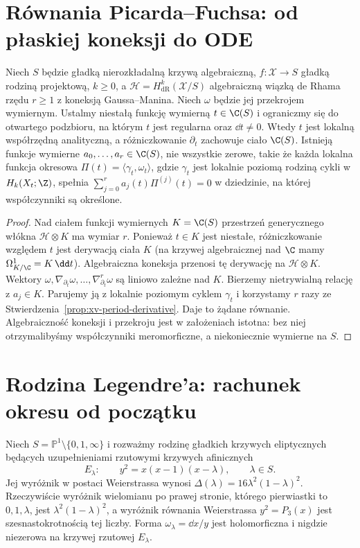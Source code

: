 \section{Równania Picarda--Fuchsa: od płaskiej koneksji do ODE}
\begin{stwierdzenie}
\label{prop:xv-pf-general}
Niech $S$ będzie gładką nierozkładalną krzywą algebraiczną,
$f:\mathcal X\to S$ gładką rodziną projektową,
$k\ge0$, a
$\mathcal H=H^k_{\mathrm{dR}}(\mathcal X/S)$
algebraiczną wiązką de Rhama rzędu $r\ge1$
z koneksją Gaussa--Manina.
Niech $\omega$ będzie jej przekrojem wymiernym. Ustalmy niestałą funkcję wymierną $t\in\C(S)$
i ograniczmy się do otwartego podzbioru, na którym $t$
jest regularna oraz $\dd t\neq0$. Wtedy $t$ jest
lokalną współrzędną analityczną, a różniczkowanie
$\partial_t$ zachowuje ciało $\C(S)$. Istnieją
funkcje wymierne $a_0,\dots,a_r\in\C(S)$, nie wszystkie zerowe,
takie że każda lokalna funkcja okresowa
$\Pi(t)=\langle\gamma_t,\omega_t\rangle$,
gdzie $\gamma_t$ jest lokalnie poziomą rodziną
cykli w $H_k(X_t;\Z)$, spełnia
$\sum_{j=0}^ra_j(t)\Pi^{(j)}(t)=0$
w dziedzinie, na której współczynniki są określone.
\end{stwierdzenie}
\begin{proof}
Nad ciałem funkcji wymiernych $K=\C(S)$ przestrzeń
generycznego włókna $\mathcal H\otimes K$ ma wymiar $r$.
Ponieważ $t\in K$ jest niestałe, różniczkowanie względem
$t$ jest derywacją ciała $K$ (na krzywej algebraicznej nad
$\C$ mamy $\Omega^1_{K/\C}=K\,\dd t$).
Algebraiczna koneksja przenosi tę derywację na $\mathcal H\otimes K$.
Wektory $\omega,\nabla_{\partial_t}\omega,\dots,
\nabla_{\partial_t}^{r}\omega$ są liniowo zależne nad $K$.
Bierzemy nietrywialną relację z $a_j\in K$.
Parujemy ją z lokalnie poziomym cyklem $\gamma_t$ i
korzystamy $r$ razy ze
Stwierdzenia~\ref{prop:xv-period-derivative}.
Daje to żądane równanie. Algebraiczność koneksji
i przekroju jest w założeniach istotna:
bez niej otrzymalibyśmy współczynniki meromorficzne,
a niekoniecznie wymierne na $S$.
\end{proof}

\section{Rodzina Legendre'a: rachunek okresu od początku}
\label{sec:xv-legendre}
Niech $S=\mathbb P^1\setminus\{0,1,\infty\}$ i rozważmy
rodzinę gładkich krzywych eliptycznych będących
uzupełnieniami rzutowymi krzywych afinicznych
\[
E_\lambda:\qquad y^2=x(x-1)(x-\lambda),\qquad \lambda\in S.
\]
Jej wyróżnik w postaci Weierstrassa wynosi
$\Delta(\lambda)=16\lambda^2(1-\lambda)^2$.
Rzeczywiście wyróżnik wielomianu po prawej stronie,
którego pierwiastki to $0,1,\lambda$, jest
$\lambda^2(1-\lambda)^2$, a wyróżnik równania
Weierstrassa $y^2=P_3(x)$ jest szesnastokrotnością tej liczby.
Forma $\omega_\lambda=\dd x/y$ jest holomorficzna i
nigdzie niezerowa na krzywej rzutowej $E_\lambda$.

